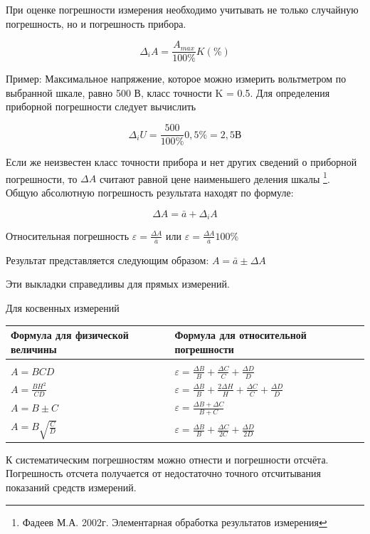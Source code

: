 \documentclass[a5paper, 10pt]{diss_4}
\renewcommand{\'}{\,'}
\begin{document}
 При оценке погрешности измерения необходимо учитывать не только случайную
погрешность, но и погрешность прибора.

\[\Delta_i A=\frac{A_{max}}{100\%}K(\%)\]

 Пример: Максимальное напряжение, которое можно измерить вольтметром по
выбранной шкале, равно 500 В, класс точности K = 0.5. Для определения
приборной погрешности следует вычислить

\[\Delta_i U=\frac{500}{100\%}0,5\%=2,5 В\]

  Если же неизвестен класс точности прибора и нет других сведений о приборной
погрешности, то $\Delta A$ считают равной цене наименьшего деления шкалы
\footnote{Фадеев М.А. 2002г. Элементарная обработка результатов измерения}.
Общую абсолютную погрешность результата находят по формуле:

\[\Delta A=\bar{a}+\Delta_i A\]

  Относительная погрешность $\varepsilon=\frac{\Delta A}{\bar{a}}$ или
$\varepsilon=\frac{\Delta A}{\bar{a}}100\%$

  Результат представляется следующим образом:
  $A=\bar{a}\pm\Delta A$

  Эти выкладки справедливы для прямых измерений.

  Для косвенных измерений

\begin{center}

\begin{tabular}[c]{l|l}
\toprule
Формула для физической величины & Формула для относительной погрешности\\  %
\midrule\\
$A=BCD$&$\varepsilon=\frac{\Delta B}{B}+\frac{\Delta C}{C}+\frac{\Delta D}{D}$\\ [5pt] %
$A=\frac{BH^2}{CD}$&$\varepsilon=\frac{\Delta B}{B}+\frac{2\Delta H}{H}+\frac{\Delta C}{C}+\frac{\Delta D}{D}$\\ [5pt] %
$A=B\pm C$&$\varepsilon=\frac{\Delta B+\Delta C}{B+C}$\\ [5pt] %
$A=B\sqrt{\frac{C}{D}}$&$\varepsilon=\frac{\Delta B}{B}+\frac{\Delta C}{2C}+\frac{\Delta D}{2D}$\\ [5pt]
\bottomrule
\end{tabular}
\end{center}


 К систематическим погрешностям можно отнести и погрешности отсчёта.
Погрешность отсчета получается от недостаточно точного отсчитывания показаний
средств измерений.
\end{document}
